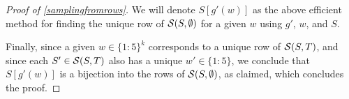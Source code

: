 \begin{proof}[Proof of \cref{samplingfromrows}]
  We will denote $S[g'(w)]$ as the above efficient method for finding the unique row of $\mathcal{S}(S,\emptyset)$ for a given $ w $  using $g'$, $w$, and $S$. 
  
  Finally, since a given $w\in \{ 1:5 \}^{k}$ corresponds to a unique row of $\mathcal{S}(S,T)$, and since each $ S'\in\mathcal{S}(S,T)  $ also has a unique $ w'\in \{ 1:5 \} $, we conclude that $ S[g'(w)] $ is a bijection into the rows of $ \mathcal{S}(S,\emptyset) $, as claimed, which concludes the proof.    
  \end{proof}
 
